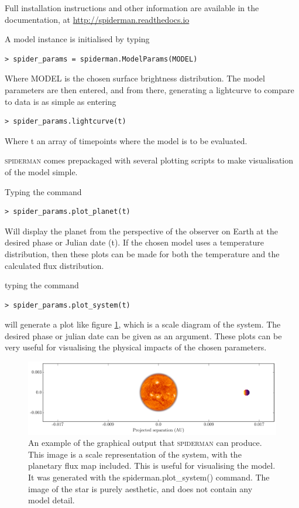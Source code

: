 \documentclass[a4paper,fleqn,usenatbib]{mnras}
\begin{document}
Full installation instructions and other information are available in the documentation, at \url{http://spiderman.readthedocs.io}

A model instance is initialised by typing

\begin{Verbatim}[frame=single]
> spider_params = spiderman.ModelParams(MODEL)
\end{Verbatim}

Where MODEL is the chosen surface brightness distribution. The model parameters are then entered, and from there, generating a lightcurve to compare to data is as simple as entering

\begin{Verbatim}[frame=single]
> spider_params.lightcurve(t)
\end{Verbatim}

Where t an array of timepoints where the model is to be evaluated.

\textsc{spiderman} comes prepackaged with several plotting scripts to make visualisation of the model simple.

Typing the command

\begin{Verbatim}[frame=single]
> spider_params.plot_planet(t)
\end{Verbatim}

Will display the planet from the perspective of the observer on Earth at the desired phase or Julian date (t). If the chosen model uses a temperature distribution, then these plots can be made for both the temperature and the calculated flux distribution.


typing the command

\begin{Verbatim}[frame=single]
> spider_params.plot_system(t)
\end{Verbatim}

will generate a plot like figure \ref{fig:plot_system}, which is a scale diagram of the system. The desired phase or julian date can be given as an argument. These plots can be very useful for visualising the physical impacts of the chosen parameters.

\begin{figure}
\begin{center}
\includegraphics[width=\textwidth]{img/system.pdf}
\caption{An example of the graphical output that \textsc{spiderman} can produce. This image is a scale representation of the system, with the planetary flux map included. This is useful for visualising the model. It was generated with the spiderman.plot\_system() command. The image of the star is purely aesthetic, and does not contain any model detail.}
\label{fig:plot_system}
\end{center}
\end{figure}
\end{document}
